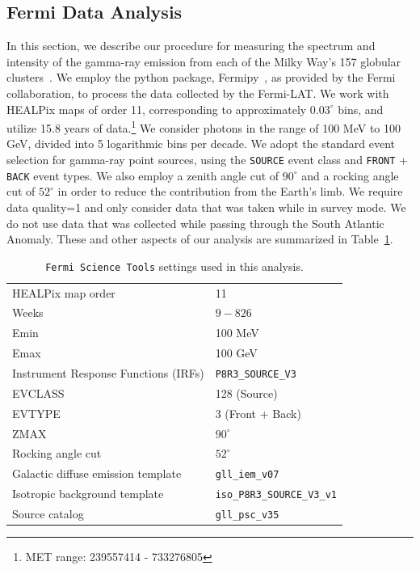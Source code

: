 \subsection{Fermi Data Analysis}
\label{sec:fermi-data-analysis}


In this section, we describe our procedure for measuring the spectrum and intensity of the gamma-ray emission from each of the Milky Way's 157 globular clusters~\cite{harris2010newcatalogglobularclusters}.
We employ the python package, Fermipy~\cite{wood2017fermipyopensourcepythonpackage}, as provided by the Fermi collaboration, to process the data collected by the Fermi-LAT. 
We work with HEALPix maps of order 11, corresponding to approximately $0.03^{\circ}$ bins, and utilize 15.8 years of data.\footnote{MET range:  239557414 - 733276805} We consider photons in the range of 100 MeV to 100 GeV, divided into 5 logarithmic bins per decade. We adopt the standard event selection for gamma-ray point sources, using the \verb|SOURCE| event class and \verb|FRONT| + \verb|BACK| event types. We also employ a zenith angle cut of $90^{\circ}$ and a rocking angle cut of $52^{\circ}$ in order to reduce the contribution from the Earth's limb. We require data quality=1 and only consider data that was taken while in survey mode. We do not use data that was collected while passing through the South Atlantic Anomaly. These and other aspects of our analysis are summarized in Table~\ref{tab:msp:settings}.

\begin{table}[t]
\centering
\begin{tabular}{ | l| l|  }
\hline
HEALPix map order& 11  \\ 
Weeks & $9-826$  \\ 
Emin & 100 MeV \\
Emax & 100 GeV \\
Instrument Response Functions (IRFs) & \verb|P8R3_SOURCE_V3| \\
EVCLASS & 128 (Source)  \\ 
EVTYPE & 3 (Front + Back)  \\
ZMAX & $90^{\circ}$ \\
Rocking angle cut & $52^{\circ}$ \\
Galactic diffuse emission template & \verb|gll_iem_v07| \\
Isotropic background template & \verb|iso_P8R3_SOURCE_V3_v1| \\
Source catalog & \verb|gll_psc_v35| \\ 
\hline
\end{tabular}
\caption{\texttt{Fermi Science Tools} settings used in this analysis. }
\label{tab:msp:settings}
\end{table}

